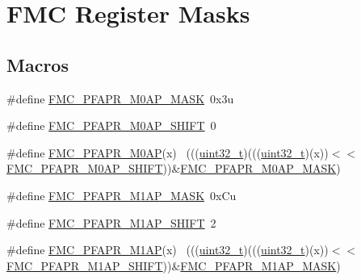 \hypertarget{group___f_m_c___register___masks}{}\section{F\+MC Register Masks}
\label{group___f_m_c___register___masks}
\subsection*{Macros}
\begin{DoxyCompactItemize}
\item 
\#define \hyperlink{group___f_m_c___register___masks_gac1ee4a2aca52fe6f68d05ce0b43dd6b8}{F\+M\+C\+\_\+\+P\+F\+A\+P\+R\+\_\+\+M0\+A\+P\+\_\+\+M\+A\+SK}~0x3u
\item 
\#define \hyperlink{group___f_m_c___register___masks_gaff9b97ca7b6e58fe7aa92c088e2f2fe1}{F\+M\+C\+\_\+\+P\+F\+A\+P\+R\+\_\+\+M0\+A\+P\+\_\+\+S\+H\+I\+FT}~0
\item 
\#define \hyperlink{group___f_m_c___register___masks_ga1c6e41857222a850ea33adcc2d81fa2d}{F\+M\+C\+\_\+\+P\+F\+A\+P\+R\+\_\+\+M0\+AP}(x)                                            ~(((\hyperlink{_p_e___types_8h_a33594304e786b158f3fb30289278f5af}{uint32\+\_\+t})(((\hyperlink{_p_e___types_8h_a33594304e786b158f3fb30289278f5af}{uint32\+\_\+t})(x))$<$$<$\hyperlink{group___f_m_c___register___masks_gaff9b97ca7b6e58fe7aa92c088e2f2fe1}{F\+M\+C\+\_\+\+P\+F\+A\+P\+R\+\_\+\+M0\+A\+P\+\_\+\+S\+H\+I\+FT}))\&\hyperlink{group___f_m_c___register___masks_gac1ee4a2aca52fe6f68d05ce0b43dd6b8}{F\+M\+C\+\_\+\+P\+F\+A\+P\+R\+\_\+\+M0\+A\+P\+\_\+\+M\+A\+SK})
\item 
\#define \hyperlink{group___f_m_c___register___masks_ga8b0888db1811509a1b7581445a8a1573}{F\+M\+C\+\_\+\+P\+F\+A\+P\+R\+\_\+\+M1\+A\+P\+\_\+\+M\+A\+SK}~0x\+Cu
\item 
\#define \hyperlink{group___f_m_c___register___masks_gac50a9d09140ddfce2457e804b44d2ce5}{F\+M\+C\+\_\+\+P\+F\+A\+P\+R\+\_\+\+M1\+A\+P\+\_\+\+S\+H\+I\+FT}~2
\item 
\#define \hyperlink{group___f_m_c___register___masks_gafe8518f8050c11ae0bfd9b4740c342cf}{F\+M\+C\+\_\+\+P\+F\+A\+P\+R\+\_\+\+M1\+AP}(x)                                            ~(((\hyperlink{_p_e___types_8h_a33594304e786b158f3fb30289278f5af}{uint32\+\_\+t})(((\hyperlink{_p_e___types_8h_a33594304e786b158f3fb30289278f5af}{uint32\+\_\+t})(x))$<$$<$\hyperlink{group___f_m_c___register___masks_gac50a9d09140ddfce2457e804b44d2ce5}{F\+M\+C\+\_\+\+P\+F\+A\+P\+R\+\_\+\+M1\+A\+P\+\_\+\+S\+H\+I\+FT}))\&\hyperlink{group___f_m_c___register___masks_ga8b0888db1811509a1b7581445a8a1573}{F\+M\+C\+\_\+\+P\+F\+A\+P\+R\+\_\+\+M1\+A\+P\+\_\+\+M\+A\+SK})

\end{DoxyCompactItemize}
